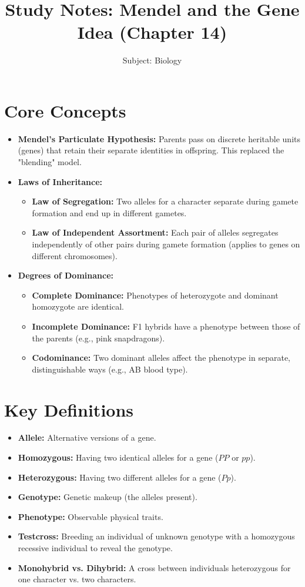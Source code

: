 \documentclass[11pt, a4paper]{article}
\title{Study Notes: Mendel and the Gene Idea (Chapter 14)}
\author{Subject: Biology}
\date{}
\begin{document}
\maketitle

\section*{Core Concepts}
\begin{itemize}
    \item \textbf{Mendel's Particulate Hypothesis:} Parents pass on discrete heritable units (genes) that retain their separate identities in offspring. This replaced the "blending" model.
    \item \textbf{Laws of Inheritance:}
    \begin{itemize}
        \item \textbf{Law of Segregation:} Two alleles for a character separate during gamete formation and end up in different gametes.
        \item \textbf{Law of Independent Assortment:} Each pair of alleles segregates independently of other pairs during gamete formation (applies to genes on different chromosomes).
    \end{itemize}
    \item \textbf{Degrees of Dominance:}
    \begin{itemize}
        \item \textbf{Complete Dominance:} Phenotypes of heterozygote and dominant homozygote are identical.
        \item \textbf{Incomplete Dominance:} F1 hybrids have a phenotype between those of the parents (e.g., pink snapdragons).
        \item \textbf{Codominance:} Two dominant alleles affect the phenotype in separate, distinguishable ways (e.g., AB blood type).
    \end{itemize}
\end{itemize}

\section*{Key Definitions}
\begin{itemize}
    \item \textbf{Allele:} Alternative versions of a gene.
    \item \textbf{Homozygous:} Having two identical alleles for a gene ($PP$ or $pp$).
    \item \textbf{Heterozygous:} Having two different alleles for a gene ($Pp$).
    \item \textbf{Genotype:} Genetic makeup (the alleles present).
    \item \textbf{Phenotype:} Observable physical traits.
    \item \textbf{Testcross:} Breeding an individual of unknown genotype with a homozygous recessive individual to reveal the genotype.
    \item \textbf{Monohybrid vs. Dihybrid:} A cross between individuals heterozygous for one character vs. two characters.
\end{itemize}
\end{document}
